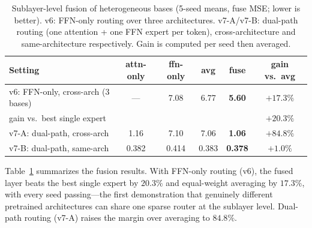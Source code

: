 \documentclass[10pt]{article}
\theoremstyle{definition}
\theoremstyle{plain}
\theoremstyle{remark}
\begin{document}
\begin{table}[htbp]
\centering
\caption{Sublayer-level fusion of heterogeneous bases (5-seed means, fuse MSE; lower is better). v6: FFN-only routing over three architectures. v7-A/v7-B: dual-path routing (one attention + one FFN expert per token), cross-architecture and same-architecture respectively. Gain is computed per seed then averaged.}
\label{tab:fusion}
\small
\setlength{\tabcolsep}{4.5pt}
\begin{tabular}{lccccc}
\toprule
\textbf{Setting} & \textbf{attn-only} & \textbf{ffn-only} & \textbf{avg} & \textbf{fuse} & \textbf{gain vs.\ avg} \\
\midrule
v6: FFN-only, cross-arch (3 bases) & --- & 7.08 & 6.77 & \textbf{5.60} & $+17.3\%$ \\
\quad gain vs.\ best single expert & & & & & $+20.3\%$ \\
v7-A: dual-path, cross-arch & 1.16 & 7.10 & 7.06 & \textbf{1.06} & $+84.8\%$ \\
v7-B: dual-path, same-arch & 0.382 & 0.414 & 0.383 & \textbf{0.378} & $+1.0\%$ \\
\bottomrule
\end{tabular}
\end{table}

Table~\ref{tab:fusion} summarizes the fusion results. With FFN-only routing (v6), the fused layer beats the best single expert by $20.3\%$ and equal-weight averaging by $17.3\%$, with every seed passing---the first demonstration that genuinely different pretrained architectures can share one sparse router at the sublayer level. Dual-path routing (v7-A) raises the margin over averaging to $84.8\%$.
\end{document}
